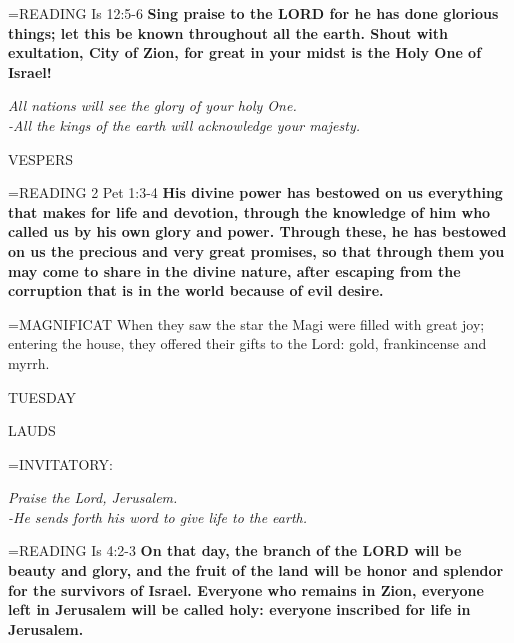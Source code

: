 \hangindent=\parindent \small{READING}    Is 12:5-6 \textbf{   Sing praise to the LORD for he has done glorious things; let this be known throughout all the earth. Shout with exultation, City of Zion, for great in your midst is the Holy One of Israel!}

\begin{center}
\textit{All nations will see the glory of your holy One.\\
-All the kings of the earth will acknowledge your majesty.}
\end{center}

\begin{flushleft}\normalsize VESPERS\\\end{flushleft}

\hangindent=\parindent \small{READING}   2 Pet 1:3-4 \textbf{  His divine power has bestowed on us everything that makes for life and devotion, through the knowledge of him who called us by his own glory and power. Through these, he has bestowed on us the precious and very great promises, so that through them you may come to share in the divine nature, after escaping from the corruption that is in the world because of evil desire.\\}

\hangindent=\parindent \small{MAGNIFICAT 	When they saw the star the Magi were filled with great joy; entering the house, they offered their gifts to the Lord: gold, frankincense and myrrh.\\}

\begin{center}
\normalsize TUESDAY
\end{center}

\begin{flushleft}\normalsize LAUDS\\\end{flushleft}

\hangindent=\parindent \small{INVITATORY:}
\begin{center}
\textit{Praise the Lord, Jerusalem.\\}
\textit{-He sends forth his word to give life to the earth.\\}
\end{center}

\hangindent=\parindent \small{READING}   Is 4:2-3 \textbf{  On that day, the branch of the LORD will be beauty and glory, and the fruit of the land will be honor and splendor for the survivors of Israel. Everyone who remains in Zion, everyone left in Jerusalem will be called holy: everyone inscribed for life in Jerusalem.\\}

